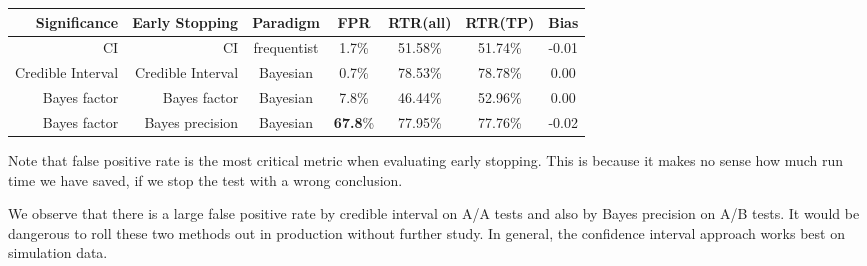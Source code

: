 \documentclass[paper=a4, fontsize=11pt]{scrartcl} %
\numberwithin{equation}{section} %
\numberwithin{figure}{section} %
\numberwithin{table}{section} %
\begin{document}
\begin{center}
  \begin{tabular}{ | r | r | c | c | c | c | c | }
    \hline
    \textbf{Significance} & \textbf{Early Stopping}  & \textbf{Paradigm} & \textbf{FPR} & \textbf{RTR(all)} & \textbf{RTR(TP)} & \textbf{Bias} \\ \hline\hline
    CI &  CI & frequentist &1.7\% & 51.58\% & 51.74\% & -0.01 \\ \hline
    Credible Interval & Credible Interval & Bayesian & 0.7\% & 78.53\% & 78.78\% & 0.00 \\ \hline
    Bayes factor & Bayes factor & Bayesian & 7.8\% & 46.44\% & 52.96\% & 0.00 \\ \hline
    Bayes factor & Bayes precision & Bayesian & \textbf{67.8}\% & 77.95\% & 77.76\% & -0.02 \\ \hline
  \end{tabular}
\end{center}

Note that false positive rate is the most critical metric when evaluating early stopping. This is because it makes no sense how much run time we have saved, if we stop the test with a wrong conclusion.

We observe that there is a large false positive rate by credible interval on A/A tests and also by Bayes precision on A/B tests. It would be dangerous to roll these two methods out in production without further study. In general, the confidence interval approach works best on simulation data.
\end{document}
